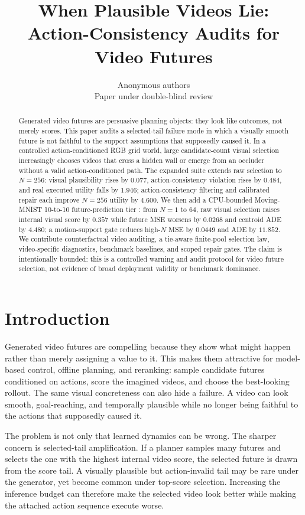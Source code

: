 \documentclass{article}
\title{When Plausible Videos Lie:\\Action-Consistency Audits for Video Futures}
\author{Anonymous authors\\Paper under double-blind review}
\begin{document}
\maketitle

\begin{abstract}
Generated video futures are persuasive planning objects: they look like outcomes, not merely scores. This paper audits a selected-tail failure mode in which a visually smooth future is not faithful to the support assumptions that supposedly caused it. In a controlled action-conditioned RGB grid world, large candidate-count visual selection increasingly chooses videos that cross a hidden wall or emerge from an occluder without a valid action-conditioned path. The expanded suite extends raw selection to \(N=256\): visual plausibility rises by \(0.077\), action-consistency violation rises by \(0.484\), and real executed utility falls by \(1.946\); action-consistency filtering and calibrated repair each improve \(N=256\) utility by \(4.600\). We then add a CPU-bounded Moving-MNIST 10-to-10 future-prediction tier \citep{srivastava2015unsupervised}: from \(N=1\) to \(64\), raw visual selection raises internal visual score by \(0.357\) while future MSE worsens by \(0.0268\) and centroid ADE by \(4.480\); a motion-support gate reduces high-\(N\) MSE by \(0.0449\) and ADE by \(11.852\). We contribute counterfactual video auditing, a tie-aware finite-pool selection law, video-specific diagnostics, benchmark baselines, and scoped repair gates. The claim is intentionally bounded: this is a controlled warning and audit protocol for video future selection, not evidence of broad deployment validity or benchmark dominance.
\end{abstract}

\section{Introduction}

Generated video futures are compelling because they show what might happen rather than merely assigning a value to it. This makes them attractive for model-based control, offline planning, and reranking: sample candidate futures conditioned on actions, score the imagined videos, and choose the best-looking rollout. The same visual concreteness can also hide a failure. A video can look smooth, goal-reaching, and temporally plausible while no longer being faithful to the actions that supposedly caused it.

The problem is not only that learned dynamics can be wrong. The sharper concern is selected-tail amplification. If a planner samples many futures and selects the one with the highest internal video score, the selected future is drawn from the score tail. A visually plausible but action-invalid tail may be rare under the generator, yet become common under top-score selection. Increasing the inference budget can therefore make the selected video look better while making the attached action sequence execute worse.
\end{document}
